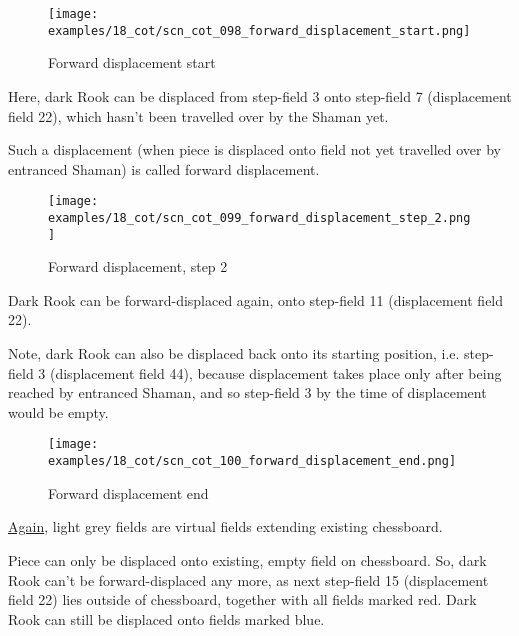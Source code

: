 \vspace*{-1.0\baselineskip}
\noindent
\begin{figure}[!h]
\texttt{[image: examples/18\_cot/scn\_cot\_098\_forward\_displacement\_start.png]}
\caption{Forward displacement start}
\label{fig:scn_cot_098_forward_displacement_start}
\end{figure}

Here, dark Rook can be displaced from step-field 3 onto step-field 7 (displacement
field 22), which hasn't been travelled over by the Shaman yet.

Such a displacement (when piece is displaced onto field not yet travelled over by
entranced Shaman) is called forward displacement.

\clearpage %

\noindent
\begin{figure}[!h]
\texttt{[image: examples/18\_cot/scn\_cot\_099\_forward\_displacement\_step\_2.png]}
\caption{Forward displacement, step 2}
\label{fig:scn_cot_099_forward_displacement_step_2}
\end{figure}

Dark Rook can be forward-displaced again, onto step-field 11 (displacement field 22).

Note, dark Rook can also be displaced back onto its starting position, i.e. step-field
3 (displacement field 44), because displacement takes place only after being reached
by entranced Shaman, and so step-field 3 by the time of displacement would be empty.

\clearpage %

\noindent
\begin{figure}[!h]
\texttt{[image: examples/18\_cot/scn\_cot\_100\_forward\_displacement\_end.png]}
\caption{Forward displacement end}
\label{fig:scn_cot_100_forward_displacement_end}
\end{figure}

\hyperref[fig:scn_hd_06_centaur_off_board]{Again},
light grey fields are virtual fields extending existing chessboard.

Piece can only be displaced onto existing, empty field on chessboard. So, dark Rook
can't be forward-displaced any more, as next step-field 15 (displacement field 22)
lies outside of chessboard, together with all fields marked red. Dark Rook can still
be displaced onto fields marked blue.

